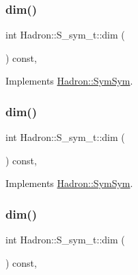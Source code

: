 \subsubsection{\texorpdfstring{dim()}{dim()}\hspace{0.1cm}{\footnotesize\ttfamily [3/5]}}
{\footnotesize\ttfamily int Hadron\+::\+S\+\_\+sym\+\_\+t\+::dim (\begin{DoxyParamCaption}{ }\end{DoxyParamCaption}) const\hspace{0.3cm}{\ttfamily [inline]}, {\ttfamily [virtual]}}



Implements \mbox{\hyperlink{structHadron_1_1SymSym_ae57780f41b9f6c03c6056eed3677bd48}{Hadron\+::\+Sym\+Sym}}.

\mbox{\label{structHadron_1_1S__sym__t_ae8b1558dc91f46f5d78de03f1e587dc0}} 
\subsubsection{\texorpdfstring{dim()}{dim()}\hspace{0.1cm}{\footnotesize\ttfamily [4/5]}}
{\footnotesize\ttfamily int Hadron\+::\+S\+\_\+sym\+\_\+t\+::dim (\begin{DoxyParamCaption}{ }\end{DoxyParamCaption}) const\hspace{0.3cm}{\ttfamily [inline]}, {\ttfamily [virtual]}}



Implements \mbox{\hyperlink{structHadron_1_1SymSym_ae57780f41b9f6c03c6056eed3677bd48}{Hadron\+::\+Sym\+Sym}}.

\mbox{\label{structHadron_1_1S__sym__t_ae8b1558dc91f46f5d78de03f1e587dc0}} 
\subsubsection{\texorpdfstring{dim()}{dim()}\hspace{0.1cm}{\footnotesize\ttfamily [5/5]}}
{\footnotesize\ttfamily int Hadron\+::\+S\+\_\+sym\+\_\+t\+::dim (\begin{DoxyParamCaption}{ }\end{DoxyParamCaption}) const\hspace{0.3cm}{\ttfamily [inline]}, {\ttfamily [virtual]}}



